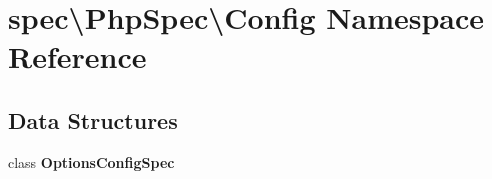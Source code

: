 \section{spec\textbackslash{}Php\+Spec\textbackslash{}Config Namespace Reference}
\label{namespacespec_1_1_php_spec_1_1_config}
\subsection*{Data Structures}
\begin{DoxyCompactItemize}
\item 
class {\bf Options\+Config\+Spec}
\end{DoxyCompactItemize}
